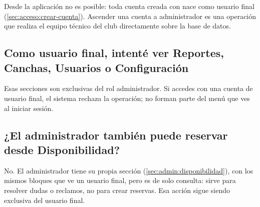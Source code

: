 Desde la aplicación no es posible: toda cuenta creada con  nace como usuario final (\cref{sec:acceso:crear-cuenta}). Ascender
una cuenta a administrador es una operación que realiza el equipo técnico
del club directamente sobre la base de datos.

\subsection*{Como usuario final, intenté ver Reportes, Canchas, Usuarios o Configuración}

Esas secciones son exclusivas del rol administrador. Si accedes con una
cuenta de usuario final, el sistema rechaza la operación; no forman parte
del menú que ves al iniciar sesión.

\subsection*{¿El administrador también puede reservar desde Disponibilidad?}

No. El administrador tiene su propia sección 
(\cref{sec:admin:disponibilidad}), con los mismos bloques que ve un
usuario final, pero es de solo consulta: sirve para resolver dudas o
reclamos, no para crear reservas. Esa acción sigue siendo exclusiva del
usuario final.
